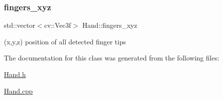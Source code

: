 \hypertarget{class_hand_afb4b29e1aaca7d0779af899a9eeaa21d}{}\label{class_hand_afb4b29e1aaca7d0779af899a9eeaa21d} 
\subsubsection{\texorpdfstring{fingers\+\_\+xyz}{fingers\_xyz}}
{\footnotesize\ttfamily std\+::vector$<$cv\+::\+Vec3f$>$ Hand\+::fingers\+\_\+xyz}



(x,y,z) position of all detected finger tips 



The documentation for this class was generated from the following files\+:\begin{DoxyCompactItemize}
\item 
\hyperlink{_hand_8h}{Hand.\+h}\item 
\hyperlink{_hand_8cpp}{Hand.\+cpp}\end{DoxyCompactItemize}
